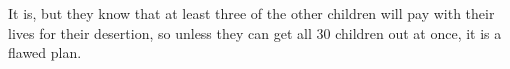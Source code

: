It is, but they know that at least three of the other children will pay with their lives for their desertion, so unless they can get all 30 children out at once, it is a flawed plan.\\

